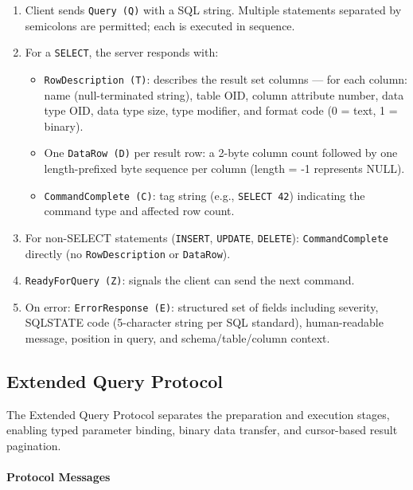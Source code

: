 \begin{enumerate}
    \item Client sends \texttt{Query (Q)} with a SQL string. Multiple statements separated by semicolons are permitted; each is executed in sequence.
    \item For a \texttt{SELECT}, the server responds with:
    \begin{itemize}
        \item \texttt{RowDescription (T)}: describes the result set columns — for each column: name (null-terminated string), table OID, column attribute number, data type OID, data type size, type modifier, and format code (0 = text, 1 = binary).
        \item One \texttt{DataRow (D)} per result row: a 2-byte column count followed by one length-prefixed byte sequence per column (length = -1 represents NULL).
        \item \texttt{CommandComplete (C)}: tag string (e.g., \texttt{SELECT 42}) indicating the command type and affected row count.
    \end{itemize}
    \item For non-SELECT statements (\texttt{INSERT}, \texttt{UPDATE}, \texttt{DELETE}): \texttt{CommandComplete} directly (no \texttt{RowDescription} or \texttt{DataRow}).
    \item \texttt{ReadyForQuery (Z)}: signals the client can send the next command.
    \item On error: \texttt{ErrorResponse (E)}: structured set of fields including severity, SQLSTATE code (5-character string per SQL standard), human-readable message, position in query, and schema/table/column context.
\end{enumerate}

\subsection{Extended Query Protocol}

The Extended Query Protocol separates the preparation and execution stages, enabling typed parameter binding, binary data transfer, and cursor-based result pagination.

\paragraph{Protocol Messages}

